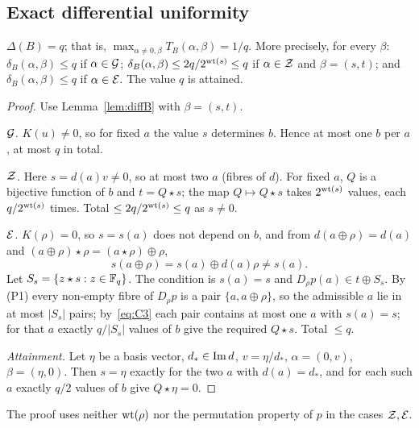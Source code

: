 \subsection{Exact differential uniformity}
\begin{theorem}\label{thm:eps}
$\Delta(B)=q$; that is, $\max_{\alpha\ne0,\beta}T_B(\alpha,\beta)=1/q$. More precisely, for every
$\beta$: $\delta_B(\alpha,\beta)\le q$ if $\alpha\in\mathcal{G}$; $\delta_B(\alpha,\beta)\le 2q/2^{\mathrm{wt}(s)}\le q$ if
$\alpha\in\mathcal{Z}$ and $\beta=(s,t)$; and $\delta_B(\alpha,\beta)\le q$ if $\alpha\in\mathcal{E}$. The value $q$ is attained.
\end{theorem}
\begin{proof}
Use Lemma~\ref{lem:diffB} with $\beta=(s,t)$.

\emph{$\mathcal{G}$.} $K(u)\ne0$, so for fixed $a$ the value $s$ determines $b$. Hence at most one $b$ per $a$, at most $q$ in total.

\emph{$\mathcal{Z}$.} Here $s=d(a)v\ne0$, so at most two $a$ (fibres of $d$). For fixed $a$, $Q$ is a
bijective function of $b$ and $t=Q\star s$; the map $Q\mapsto Q\star s$ takes $2^{\mathrm{wt}(s)}$ values, each
$q/2^{\mathrm{wt}(s)}$ times. Total $\le 2q/2^{\mathrm{wt}(s)}\le q$ as $s\ne0$.

\emph{$\mathcal{E}$.} $K(\rho)=0$, so $s=s(a)$ does not depend on $b$, and from $d(a\oplus\rho)=d(a)$ and
$(a\oplus\rho)\star\rho=(a\star\rho)\oplus\rho$,
\begin{equation}\label{eq:C3}
s(a\oplus\rho)=s(a)\oplus d(a)\rho\ne s(a).
\end{equation}
Let $S_s=\{z\star s:z\in\mathbb{F}_q\}$. The condition is $s(a)=s$ and $D_\rho p(a)\in t\oplus S_s$. By (P1) every
non-empty fibre of $D_\rho p$ is a pair $\{a,a\oplus\rho\}$, so the admissible $a$ lie in at most $|S_s|$
pairs; by~\eqref{eq:C3} each pair contains at most one $a$ with $s(a)=s$; for that $a$ exactly
$q/|S_s|$ values of $b$ give the required $Q\star s$. Total $\le q$.

\emph{Attainment.} Let $\eta$ be a basis vector, $d_*\in\mathrm{Im}\, d$, $v=\eta/d_*$, $\alpha=(0,v)$, $\beta=(\eta,0)$.
Then $s=\eta$ exactly for the two $a$ with $d(a)=d_*$, and for each such $a$ exactly $q/2$ values of $b$
give $Q\star\eta=0$.
\end{proof}

The proof uses neither $\mathrm{wt}(\rho)$ nor the permutation property of $p$ in the cases $\mathcal{Z},\mathcal{E}$.

